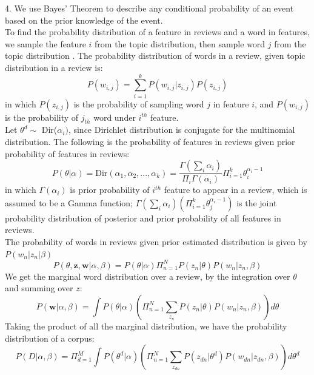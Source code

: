 \documentclass[reqno]{article}
\renewcommand{\vec}[1]{\mathbf{#1}}
\theoremstyle{definition}
\theoremstyle{definition}
\theoremstyle{remark}
\begin{document}
4. We use Bayes' Theorem to describe any conditional probability of an event based on the prior knowledge of the event.\\
To find the probability distribution of a feature in reviews and a word in features, we sample the feature $i$ from the topic distribution, then sample word $j$ from the topic distribution \cite{steyvers}. The probability distribution of words in a review, given topic distribution in a review is:
\begin{equation}
    P(w_{i,j}) = \sum_{i=1}^{k}P(w_{i,j} | z_{i,j})P(z_{i,j})
\end{equation}
in which $P(z_{i,j})$ is the probability of sampling word $j$ in feature $i$, and $P(w_{i,j})$ is the probability of $j_{th}$ word under $i^{th}$ feature. \\
Let $\theta^d \sim$ Dir($\alpha_i)$, since Dirichlet distribution is conjugate for the multinomial distribution. The following is the probability of features in reviews given prior probability of features in reviews: \\
\begin{equation}
    P(\theta|\alpha) = \mathrm{Dir}(\alpha_{1},\alpha_{2},...,\alpha_k) =  \frac{\Gamma(\sum_i{\alpha_i})}{\Pi_i{\Gamma(\alpha_i)}} \Pi_{i=1}^k \theta^{\alpha_{i} - 1}_i
\end{equation}
in which $\Gamma(\alpha_i)$ is prior probability of $i^{th}$ feature to appear in a review, which is assumed to be a Gamma function; $\Gamma(\sum_i{\alpha_i})(\Pi_{i=1}^k \theta^{\alpha_{i} - 1}_j)$ is the joint probability distribution of posterior and prior probability of all features in reviews. \\
The probability of words in reviews given prior estimated distribution is given by $P(w_{n} | z_{n}|\beta)$\\
\begin{equation}
    P(\theta,\vec{z},\vec{w}|\alpha,\beta) = P(\theta|\alpha)\Pi_{n=1}^{N}P(z_{n}|\theta)P(w_n|z_n,\beta)
\end{equation}
We get the marginal word distribution over a review, by the integration over $\theta$ and summing over $z$:
\begin{equation}
    P(\vec{w}|\alpha,\beta) = \int P(\theta|\alpha)(\Pi_{n=1}^{N}\sum_z_n P(z_{n}|\theta)P(w_n|z_n,\beta)) d\theta
\end{equation}
Taking the product of all the marginal distribution, we have the probability distribution of a corpus:
\begin{equation}
   P(D|\alpha,\beta) = \Pi_{d=1}^M{\int P(\theta^d|\alpha)(\Pi_{n=1}^{N}\sum_z_{dn} P(z_{dn}|\theta^d)P(w_{dn}|z_{dn},\beta)) d\theta^d}
\end{equation}
\end{document}
